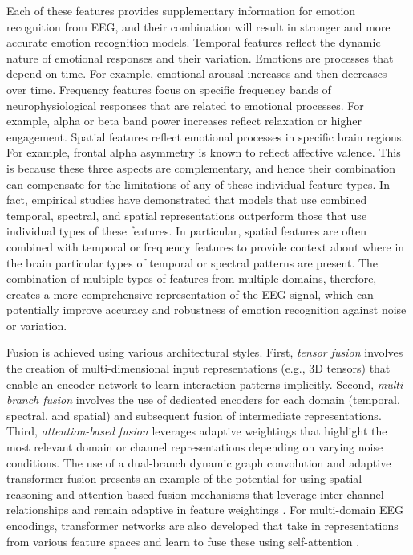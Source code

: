 \documentclass{WileyMSP-template}
\begin{document}
Each of these features provides supplementary information for emotion recognition from EEG, and their combination will result in stronger and more accurate emotion recognition models. Temporal features reflect the dynamic nature of emotional responses and their variation. Emotions are processes that depend on time. For example, emotional arousal increases and then decreases over time. Frequency features focus on specific frequency bands of neurophysiological responses that are related to emotional processes. For example, alpha or beta band power increases reflect relaxation or higher engagement. Spatial features reflect emotional processes in specific brain regions. For example, frontal alpha asymmetry is known to reflect affective valence. This is because these three aspects are complementary, and hence their combination can compensate for the limitations of any of these individual feature types. In fact, empirical studies have demonstrated that models that use combined temporal, spectral, and spatial representations outperform those that use individual types of these features. In particular, spatial features are often combined with temporal or frequency features to provide context about where in the brain particular types of temporal or spectral patterns are present. The combination of multiple types of features from multiple domains, therefore, creates a more comprehensive representation of the EEG signal, which can potentially improve accuracy and robustness of emotion recognition against noise or variation.

Fusion is achieved using various architectural styles. First, \emph{tensor fusion} involves the creation of multi-dimensional input representations (e.g., 3D tensors) that enable an encoder network to learn interaction patterns implicitly. Second, \emph{multi-branch fusion} involves the use of dedicated encoders for each domain (temporal, spectral, and spatial) and subsequent fusion of intermediate representations. Third, \emph{attention-based fusion} leverages adaptive weightings that highlight the most relevant domain or channel representations depending on varying noise conditions. The use of a dual-branch dynamic graph convolution and adaptive transformer fusion presents an example of the potential for using spatial reasoning and attention-based fusion mechanisms that leverage inter-channel relationships and remain adaptive in feature weightings \cite{sun2022atffnet}. For multi-domain EEG encodings, transformer networks are also developed that take in representations from various feature spaces and learn to fuse these using self-attention \cite{sun2023meegtransformer}.
\end{document}
